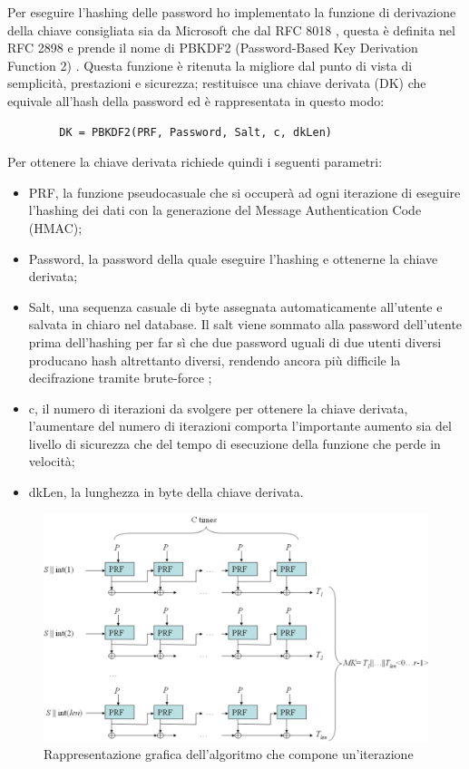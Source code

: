 Per eseguire l'hashing delle password ho implementato la funzione di derivazione della chiave consigliata sia da Microsoft \cite{HashingASPNET} che dal RFC 8018 \cite{RFC8018}, questa è definita nel RFC 2898 \cite{RFC2898} e prende il nome di PBKDF2 (Password-Based Key Derivation Function 2) \cite{PBKDF2}. Questa funzione è ritenuta la migliore dal punto di vista di semplicità, prestazioni e sicurezza; restituisce una chiave derivata (DK) che equivale all'hash della password ed è rappresentata in questo modo:

\begin{center}
    \begin{lstlisting}
        DK = PBKDF2(PRF, Password, Salt, c, dkLen) 
    \end{lstlisting}
\end{center}
\clearpage

Per ottenere la chiave derivata richiede quindi i seguenti parametri: 
\begin{itemize}
    \item PRF, la funzione pseudocasuale che si occuperà ad ogni iterazione di eseguire l'hashing dei dati con la generazione del Message Authentication Code (HMAC);
    \item Password, la password della quale eseguire l'hashing e ottenerne la chiave derivata;
    \item Salt, una sequenza casuale di byte assegnata automaticamente all'utente e salvata in chiaro nel database. Il salt viene sommato alla password dell'utente prima dell'hashing per far sì che due password uguali di due utenti diversi producano hash altrettanto diversi, rendendo ancora più difficile la decifrazione tramite brute-force \cite{Salt};
    \item c, il numero di iterazioni da svolgere per ottenere la chiave derivata, l'aumentare del numero di iterazioni comporta l'importante aumento sia del livello di sicurezza che del tempo di esecuzione della funzione che perde in velocità;
    \item dkLen, la lunghezza in byte della chiave derivata.
\end{itemize}
\medskip

\begin{figure}[ht]
    \centering\includegraphics[scale=0.44]{images/Pbkdf2.png}
    \caption{Rappresentazione grafica dell'algoritmo che compone un'iterazione}
\end{figure}

